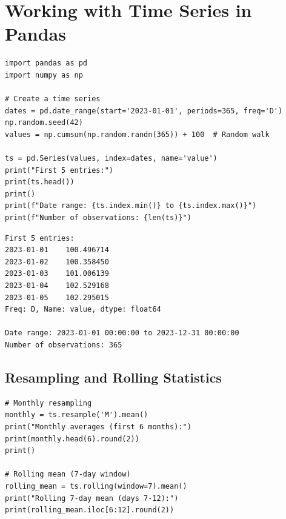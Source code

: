 \section{Working with Time Series in Pandas}
\label{sec:pandas_timeseries}


\begin{codeblock}[title=\textbf{Python}]
\begin{verbatim}
import pandas as pd
import numpy as np

# Create a time series
dates = pd.date_range(start='2023-01-01', periods=365, freq='D')
np.random.seed(42)
values = np.cumsum(np.random.randn(365)) + 100  # Random walk

ts = pd.Series(values, index=dates, name='value')
print("First 5 entries:")
print(ts.head())
print()
print(f"Date range: {ts.index.min()} to {ts.index.max()}")
print(f"Number of observations: {len(ts)}")
\end{verbatim}
\end{codeblock}

\begin{codeoutput}
\begin{verbatim}
First 5 entries:
2023-01-01    100.496714
2023-01-02    100.358450
2023-01-03    101.006139
2023-01-04    102.529168
2023-01-05    102.295015
Freq: D, Name: value, dtype: float64

Date range: 2023-01-01 00:00:00 to 2023-12-31 00:00:00
Number of observations: 365
\end{verbatim}
\end{codeoutput}

\subsection{Resampling and Rolling Statistics}


\begin{codeblock}[title=\textbf{Python}]
\begin{verbatim}
# Monthly resampling
monthly = ts.resample('M').mean()
print("Monthly averages (first 6 months):")
print(monthly.head(6).round(2))
print()

# Rolling mean (7-day window)
rolling_mean = ts.rolling(window=7).mean()
print("Rolling 7-day mean (days 7-12):")
print(rolling_mean.iloc[6:12].round(2))
\end{verbatim}
\end{codeblock}

